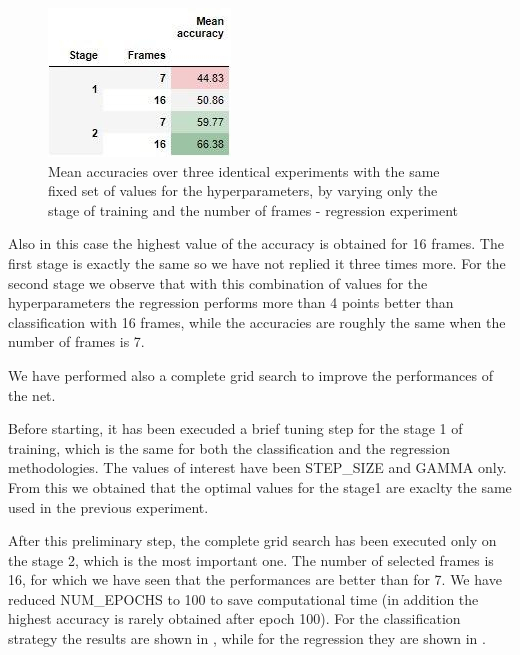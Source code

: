 \documentclass[10pt,twocolumn,hidelinks,letterpaper]{article}
\begin{document}
\begin{figure}[t]
	\centering
	\includegraphics[width=.52\linewidth]{images/step2.3_table.jpg}
	\caption{Mean accuracies over three identical experiments with the same fixed set of values for the hyperparameters, by varying only the stage of training and the number of frames - regression experiment}
	\label{ms_reg_table}
\end{figure}

Also in this case the highest value of the accuracy is obtained for 16 frames. The first stage is exactly the same so we have not replied it three times more. For the second stage we observe that with this combination of values for the hyperparameters the regression performs more than 4 points better than classification with 16 frames, while the accuracies are roughly the same when the number of frames is 7.

We have performed also a complete grid search to improve the performances of the net.

Before starting, it has been execuded a brief tuning step for the stage 1 of training, which is the same for both the classification and the regression methodologies. The values of interest have been STEP\_SIZE and GAMMA only. From this we obtained that the optimal values for the stage1 are exaclty the same used in the previous experiment.

After this preliminary step, the complete grid search has been executed only on the stage 2, which is the most important one. The number of selected frames is 16, for which we have seen that the performances are better than for 7. We have reduced NUM\_EPOCHS to 100 to save computational time (in addition the highest accuracy is rarely obtained after epoch 100). For the classification strategy the results are shown in , while for the regression they are shown in .
\end{document}
